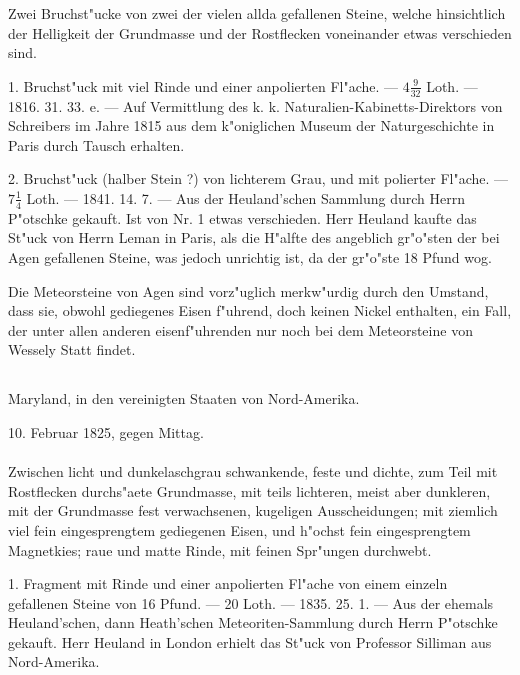 \documentclass[a4paper, 11pt, oneside, polutonikogreek, german]{article}
\begin{document}
Zwei Bruchst"ucke von zwei der vielen allda gefallenen Steine, welche hinsichtlich der Helligkeit der Grundmasse und der Rostflecken voneinander etwas verschieden sind.

1. Bruchst"uck mit viel Rinde und einer anpolierten Fl"ache. --- $\mathfrak{4\frac{9}{32}}$ Loth. --- 1816. 31. 33. e. --- Auf Vermittlung des k. k. Naturalien-Kabinetts-Direktors von Schreibers im Jahre 1815 aus dem k"oniglichen Museum der Naturgeschichte in Paris durch Tausch erhalten.

2. Bruchst"uck (halber Stein ?) von lichterem Grau, und mit polierter Fl"ache. --- $\mathfrak{7\frac{1}{4}}$ Loth. --- 1841. 14. 7. --- Aus der Heuland'schen Sammlung durch Herrn P"otschke gekauft. Ist von Nr. 1 etwas verschieden. Herr Heuland kaufte das St"uck von Herrn Leman in Paris, als die H"alfte des angeblich gr"o"sten der bei Agen gefallenen Steine, was jedoch unrichtig ist, da der gr"o"ste 18 Pfund wog.

\setlength{\leftskip}{10mm}
\setlength{\parindent}{0pt}

{\footnotesize Die Meteorsteine von Agen sind vorz"uglich merkw"urdig durch den Umstand, dass sie, obwohl gediegenes Eisen f"uhrend, doch keinen Nickel enthalten, ein Fall, der unter allen anderen eisenf"uhrenden nur noch bei dem Meteorsteine von Wessely Statt findet.}

\setlength{\leftskip}{0pt}
\setlength{\parindent}{20pt}

\subsection{}
\begin{center}

Maryland, in den vereinigten Staaten von Nord-Amerika.

10. Februar 1825, gegen Mittag.
\end{center}
\paragraph{}
Zwischen licht und dunkelaschgrau schwankende, feste und dichte, zum Teil mit Rostflecken durchs"aete Grundmasse, mit teils lichteren, meist aber dunkleren, mit der Grundmasse fest verwachsenen, kugeligen Ausscheidungen; mit ziemlich viel fein eingesprengtem gediegenen Eisen, und h"ochst fein eingesprengtem Magnetkies; raue und matte Rinde, mit feinen Spr"ungen durchwebt.

1. Fragment mit Rinde und einer anpolierten Fl"ache von einem einzeln gefallenen Steine von 16 Pfund. --- 20 Loth. --- 1835. 25. 1. --- Aus der ehemals Heuland'schen, dann Heath'schen Meteoriten-Sammlung durch Herrn P"otschke gekauft. Herr Heuland in London erhielt das St"uck von Professor Silliman aus Nord-Amerika.
\end{document}
